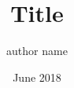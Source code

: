 \documentclass{beamer}
\title{Title}    %
\subtitle{}
\author{author name}                 %
\institute{My Institute Name Researcher\\[0.5cm] visting Institute}      %
\date{June 2018}                    %
\begin{document}
\begin{frame}
\titlepage
\end{frame}
\end{document}
